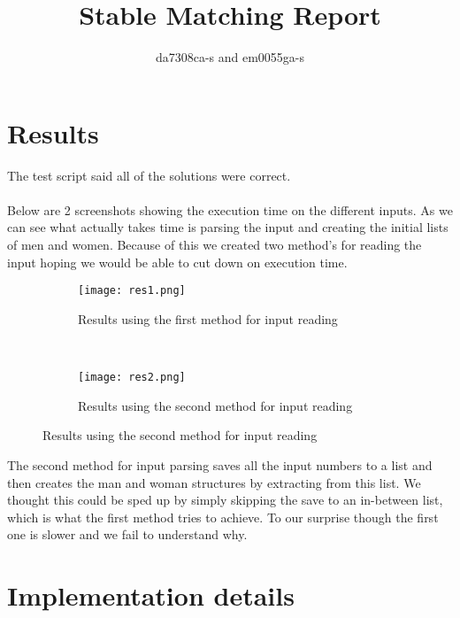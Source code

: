 \documentclass{article}
\title{Stable Matching Report}
\author{da7308ca-s and em0055ga-s}
\begin{document}
  \maketitle

  \section{Results}


  
  The test script said all of the solutions were correct.
  \\\\
  Below are 2 screenshots showing the execution time on the different inputs. As we can see what actually takes time is parsing the input and creating the initial lists of men and women. Because of this we created two method's for reading the input hoping we would be able to cut down on execution time. 
  
  \begin{figure}[H]
  \centering
  \begin{subfigure}[t]{.48\linewidth}
  \texttt{[image: res1.png]}
  \centering
    \caption{Results using the first method for input reading}
  \end{subfigure}
  ~
  \begin{subfigure}[t]{.48\linewidth}
  \texttt{[image: res2.png]}
  \centering
  \caption{Results using the second method for input reading}
  \end{subfigure}
\end{figure}
   The second method for input parsing saves all the input numbers to a list and then creates the man and woman structures by extracting from this list. We thought this could be sped up by simply skipping the save to an in-between list, which is what the first method tries to achieve. To our surprise though the first one is slower and we fail to understand why. 

  \section{Implementation details}

  
\end{document}
